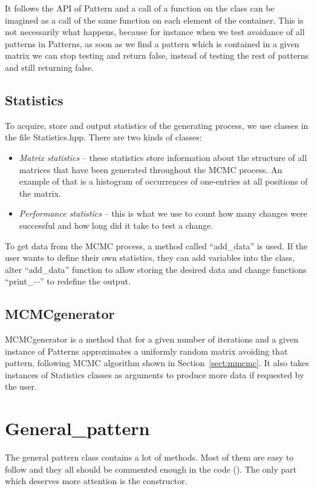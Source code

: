 It follows the API of Pattern and a call of a function on the class can be imagined as a call of the same function on each element of the container. This is not necessarily what happens, because for instance when we test avoidance of all patterns in Patterns, as soon as we find a pattern which is contained in a given matrix we can stop testing and return false, instead of testing the rest of patterns and still returning false.

\subsection{Statistics}
To acquire, store and output statistics of the generating process, we use classes in the file Statistics.hpp. There are two kinds of classes:
\begin{itemize}
\item \emph{Matrix statistics} -- these statistics store information about the structure of all matrices that have been generated throughout the MCMC process. An example of that is a histogram of occurrences of one-entries at all positions of the matrix.
\item \emph{Performance statistics} -- this is what we use to count how many changes were successful and how long did it take to test a change.
\end{itemize}

To get data from the MCMC process, a method called ``add\_data'' is used. If the user wants to define their own statistics, they can add variables into the class, alter ``add\_data'' function to allow storing the desired data and change functions ``print\_$\cdots$'' to redefine the output.

\subsection{MCMCgenerator}
MCMCgenerator is a method that for a given number of iterations and a given instance of Patterns approximates a uniformly random matrix avoiding that pattern, following MCMC algorithm shown in Section~\ref{sect:mmcmc}. It also takes instances of Statistics classes as arguments to produce more data if requested by the user.

\section{General\_pattern}
The general pattern class contains a lot of methods. Most of them are easy to follow and they all should be commented enough in the code (\cite{program}). The only part which deserves more attention is the constructor.

